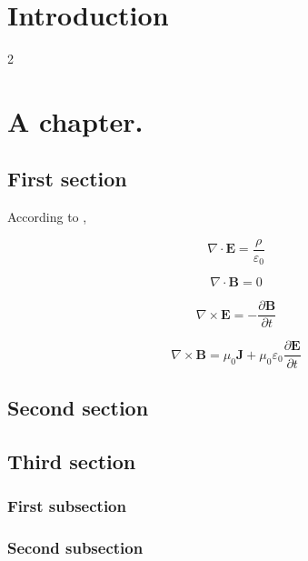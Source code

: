\chapter*{Introduction}

\begin{multicols}{2}

\noindent \lipsum[1-3]

\end{multicols}{}

\chapter{A chapter.}
\section{First section}

\noindent According to \cite{maxwell1873}, \newline

\begin{equation}
    \nabla \cdot \mathbf{E}
    = \frac{\rho}{\varepsilon_0}
\end{equation}

\begin{equation}
    \nabla \cdot \mathbf{B} = 0
\end{equation}

\begin{equation}
    \nabla \times \mathbf{E}
    = -\frac{\partial \mathbf{B}}{\partial t}
\end{equation}

\begin{equation}
    \nabla \times \mathbf{B}
    = \mu_0 \mathbf{J}
    + \mu_0 \varepsilon_0
    \frac{\partial \mathbf{E}}{\partial t}
\end{equation}

\vspace{1em}

\noindent \lipsum[1-3]

\section{Second section}

\noindent \lipsum[3-5]

\section{Third section}
\subsection{First subsection}

\noindent \lipsum[5-7]

\subsection{Second subsection}

\noindent \lipsum[7-9]
